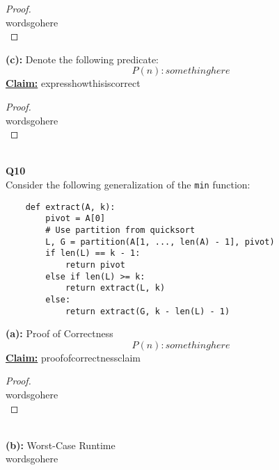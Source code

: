 \documentclass[12pt]{article}
\begin{document}
\begin{proof}
\leavevmode\\
    wordsgohere \\
\end{proof}
\leavevmode
\textbf{(c):} Denote the following predicate:
\[P(n): somethinghere\]
\textbf{\underline{Claim:}} expresshowthisiscorrect
\begin{proof}
\leavevmode\\
    wordsgohere \\
\end{proof}
\leavevmode\\
\textbf{Q10} \\
Consider the following generalization of the \texttt{min} function:
\begin{lstlisting}
    def extract(A, k):
        pivot = A[0]
        # Use partition from quicksort
        L, G = partition(A[1, ..., len(A) - 1], pivot)
        if len(L) == k - 1:
            return pivot
        else if len(L) >= k:
            return extract(L, k)
        else:
            return extract(G, k - len(L) - 1)
\end{lstlisting}
\textbf{(a):} Proof of Correctness \\
\[P(n): somethinghere\]
\textbf{\underline{Claim:}} proofofcorrectnessclaim
\begin{proof}
\leavevmode\\
    wordsgohere \\
\end{proof}
\leavevmode\\
\textbf{(b):} Worst-Case Runtime \\
wordsgohere \\
\\
\end{document}
